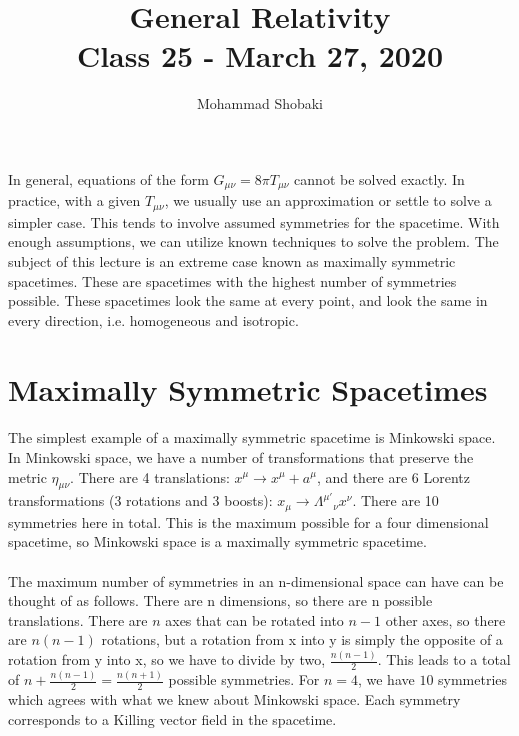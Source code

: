 \documentclass[10pt]{article}
\title{{\Huge General Relativity}\\{\Large{Class 25 - March 27, 2020}}} %
\author{Mohammad Shobaki}
\begin{document}
    \maketitle
    \flushbottom
    \newpage
    \pagestyle{fancynotes}

     \paragraph{}In general, equations of the form ${G}_{\mu\nu}=8\pi{T}_{\mu\nu}$ cannot be solved exactly. In practice, with a given ${T}_{\mu\nu}$, we usually use an approximation or settle to solve a simpler case. This tends to involve assumed symmetries for the spacetime. With enough assumptions, we can utilize known techniques to solve the problem. The subject of this lecture is an extreme case known as maximally symmetric spacetimes. These are spacetimes with the highest number of symmetries possible. These spacetimes look the same at every point, and look the same in every direction, i.e. homogeneous and isotropic. 
     
     \section{Maximally Symmetric Spacetimes}
     \paragraph{}The simplest example of a maximally symmetric spacetime is Minkowski space. In Minkowski space, we have a number of transformations that preserve the metric ${\eta}_{\mu\nu}$. There are 4 translations: ${x}^{\mu} \rightarrow {x}^{\mu} + {a}^{\mu}$, and there are 6 Lorentz transformations (3 rotations and 3 boosts): ${x}_{\mu} \rightarrow {{\Lambda}^{\mu'}}_{\nu} {x}^{\nu}$. There are 10 symmetries here in total. This is the maximum possible for a four dimensional spacetime, so Minkowski space is a maximally symmetric spacetime.
     
     \paragraph{} The maximum number of symmetries in an n-dimensional space can have can be thought of as follows. There are n dimensions, so there are n possible translations. There are $n$ axes that can be rotated into $n-1$ other axes, so there are $n(n-1)$ rotations, but a rotation from x into y is simply the opposite of a rotation from y into x, so we have to divide by two, $\frac{n(n-1)}{2}$. This leads to a total of $n + \frac{n(n-1)}{2} = \frac{n(n+1)}{2}$ possible symmetries. For $n=4$, we have $10$ symmetries which agrees with what we knew about Minkowski space. Each symmetry corresponds to a Killing vector field in the spacetime. 
     
\end{document}
